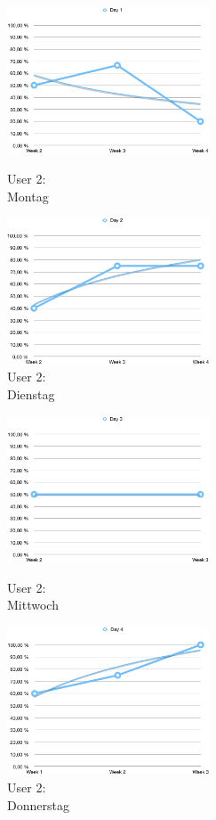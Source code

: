 \begin{figure}[t!]
    \centering
    \parbox{6cm}{
    \includegraphics[width=6cm]{./Abbildungen/Kapitel_04/usr2day1.png}
    \caption{User 2: \\Montag}
    \label{img:usr2day1}}
    \qquad
    \begin{minipage}{6cm}
    \includegraphics[width=6cm]{./Abbildungen/Kapitel_04/usr2day2.png}
    \caption{User 2: \\Dienstag}
    \label{img:usr2day2}
    \end{minipage}
\end{figure}


\begin{figure}[t!]
    \centering
    \parbox{6cm}{
    \includegraphics[width=6cm]{./Abbildungen/Kapitel_04/usr2day3.png}
    \caption{User 2: \\Mittwoch}
    \label{img:usr2day3}}
    \qquad
    \begin{minipage}{6cm}
    \includegraphics[width=6cm]{./Abbildungen/Kapitel_04/usr2day4.png}
    \caption{User 2: \\Donnerstag}
    \label{img:usr2day4}
    \end{minipage}
\end{figure}


